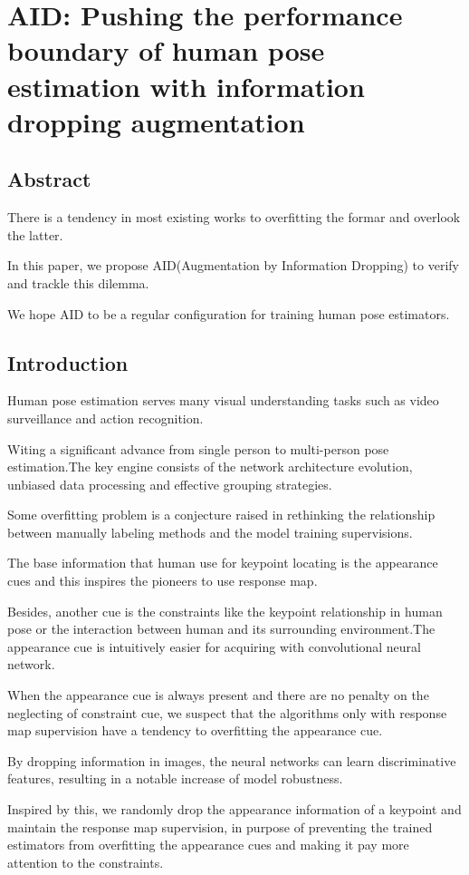 \documentclass[11pt]{article}
\begin{document}
\section{AID: Pushing the performance boundary of human pose estimation with information dropping augmentation}
\subsection{Abstract}
There is a tendency in most existing works to overfitting the formar and overlook the latter.

In this paper, we propose AID(Augmentation by Information Dropping) to verify and trackle this dilemma.

We hope AID to be a regular configuration for training human pose estimators.
\subsection{Introduction}
Human pose estimation serves many visual understanding tasks such as video surveillance and action recognition.

Witing a significant advance from single person to multi-person pose estimation.The key engine consists of the network architecture evolution, unbiased data processing and effective grouping strategies.

Some overfitting problem is a conjecture raised in rethinking the relationship between manually labeling methods and the model training supervisions.

The base information that human use for keypoint locating is the appearance cues and this inspires the pioneers to use response map.

Besides, another cue is the constraints like the keypoint relationship in human pose or the interaction between human and its surrounding environment.The appearance cue is intuitively easier for acquiring with convolutional neural network.

When the appearance cue is always present and there are no penalty on the neglecting of constraint cue, we suspect that the algorithms only with response map supervision have a tendency to overfitting the appearance cue.

By dropping information in images, the neural networks can learn discriminative features, resulting in a notable increase of model robustness.

Inspired by this, we randomly drop the appearance information of a keypoint and maintain the response map supervision, in purpose of preventing the trained estimators from overfitting the appearance cues and making it pay more attention to the constraints.
\end{document}
